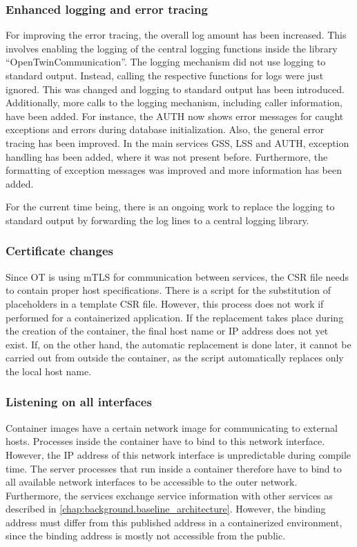 \subsubsection*{Enhanced logging and error tracing}
For improving the error tracing, the overall log amount has been increased. This involves enabling the logging of the central logging functions inside the library \enquote{OpenTwinCommunication}. The logging mechanism did not use logging to standard output. Instead, calling the respective functions for logs were just ignored. This was changed and logging to standard output has been introduced.
Additionally, more calls to the logging mechanism, including caller information, have been added. For instance, the \ac{AUTH} now shows error messages for caught exceptions and errors during database initialization.
Also, the general error tracing has been improved. In the main services \ac{GSS}, \ac{LSS} and \ac{AUTH}, exception handling has been added, where it was not present before. Furthermore, the formatting of exception messages was improved and more information has been added.

For the current time being, there is an ongoing work to replace the logging to standard output by forwarding the log lines to a central logging library.

\subsubsection*{Certificate changes}
Since \ac{OT} is using \ac{mTLS} for communication between services, the \ac{CSR} file needs to contain proper host specifications. There is a script for the substitution of placeholders in a template \ac{CSR} file. However, this process does not work if performed for a containerized application. If the replacement takes place during the creation of the container, the final host name or \ac{IP} address does not yet exist. If, on the other hand, the automatic replacement is done later, it cannot be carried out from outside the container, as the script automatically replaces only the local host name.


\subsubsection*{Listening on all interfaces}
Container images have a certain network image for communicating to external hosts. Processes inside the container have to bind to this network interface. However, the \ac{IP} address of this network interface is unpredictable during compile time. The server processes that run inside a container therefore have to bind to all available network interfaces to be accessible to the outer network.
Furthermore, the services exchange service information with other services as described in \autoref{chap:background.baseline_architecture}. However, the binding address must differ from this published address in a containerized environment, since the binding address is mostly not accessible from the public. 

